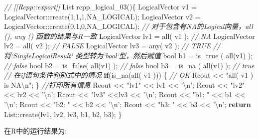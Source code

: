 \documentclass[]{ctexbook}
\newenvironment{Shaded}{\begin{snugshade}}{\end{snugshade}}
\newcommand{\DataTypeTok}[1]{\textcolor[rgb]{0.13,0.29,0.53}{#1}}
\newcommand{\DecValTok}[1]{\textcolor[rgb]{0.00,0.00,0.81}{#1}}
\newcommand{\SpecialCharTok}[1]{\textcolor[rgb]{0.00,0.00,0.00}{#1}}
\newcommand{\StringTok}[1]{\textcolor[rgb]{0.31,0.60,0.02}{#1}}
\newcommand{\CommentTok}[1]{\textcolor[rgb]{0.56,0.35,0.01}{\textit{#1}}}
\newcommand{\ControlFlowTok}[1]{\textcolor[rgb]{0.13,0.29,0.53}{\textbf{#1}}}
\newcommand{\NormalTok}[1]{#1}
\begin{document}
\begin{Shaded}
\begin{Highlighting}[]
\CommentTok{// [[Rcpp::export]]}
\NormalTok{List rcpp_logical_03()\{}
\NormalTok{  LogicalVector v1 = LogicalVector::create(}\DecValTok{1}\NormalTok{,}\DecValTok{1}\NormalTok{,}\DecValTok{1}\NormalTok{,NA_LOGICAL);}
\NormalTok{  LogicalVector v2 = LogicalVector::create(}\DecValTok{0}\NormalTok{,}\DecValTok{1}\NormalTok{,}\DecValTok{0}\NormalTok{,NA_LOGICAL);}
  \CommentTok{// 对于包含有NA的Logical向量，all (), any () 函数的结果与R一致 }
\NormalTok{  LogicalVector lv1 = all( v1 );   }\CommentTok{// NA}
\NormalTok{  LogicalVector lv2 = all( v2 );   }\CommentTok{// FALSE}
\NormalTok{  LogicalVector lv3 = any( v2 ); }\CommentTok{// TRUE}
  \CommentTok{// 将`SingleLogicalResult` 类型转为`bool`型，然后赋值}
  \DataTypeTok{bool}\NormalTok{ b1 = is_true ( all(v1) );  }\CommentTok{// false}
  \DataTypeTok{bool}\NormalTok{ b2 = is_false( all(v1) );  }\CommentTok{// false}
  \DataTypeTok{bool}\NormalTok{ b3 = is_na   ( all(v1) );  }\CommentTok{// true}
  \CommentTok{// 在if语句条件判别式中的情况}
  \ControlFlowTok{if}\NormalTok{(is_na(all( v1 ))) \{ }\CommentTok{// OK}
\NormalTok{    Rcout << }\StringTok{"all( v1 ) is NA}\SpecialCharTok{\textbackslash{}n}\StringTok{"}\NormalTok{;}
\NormalTok{  \}}
  \CommentTok{//打印所有信息}
\NormalTok{  Rcout << }\StringTok{"lv1"}\NormalTok{ << lv1 << }\StringTok{'}\SpecialCharTok{\textbackslash{}n}\StringTok{'}\NormalTok{;}
\NormalTok{  Rcout << }\StringTok{"lv2"}\NormalTok{ << lv2 << }\StringTok{'}\SpecialCharTok{\textbackslash{}n}\StringTok{'}\NormalTok{;}
\NormalTok{  Rcout << }\StringTok{"lv3"}\NormalTok{ <<lv3 << }\StringTok{'}\SpecialCharTok{\textbackslash{}n}\StringTok{'}\NormalTok{;}
\NormalTok{  Rcout << }\StringTok{"b1: "}\NormalTok{ << b1 << }\StringTok{'}\SpecialCharTok{\textbackslash{}n}\StringTok{'}\NormalTok{;}
\NormalTok{  Rcout << }\StringTok{"b2: "}\NormalTok{ << b2 << }\StringTok{'}\SpecialCharTok{\textbackslash{}n}\StringTok{'}\NormalTok{;}
\NormalTok{  Rcout << }\StringTok{"b3: "}\NormalTok{ << b3 << }\StringTok{'}\SpecialCharTok{\textbackslash{}n}\StringTok{'}\NormalTok{;}
  \ControlFlowTok{return}\NormalTok{ List::create(lv1, lv2, lv3, b1, b2, b3);}
\NormalTok{\}}
\end{Highlighting}
\end{Shaded}

在R中的运行结果为:
\end{document}
